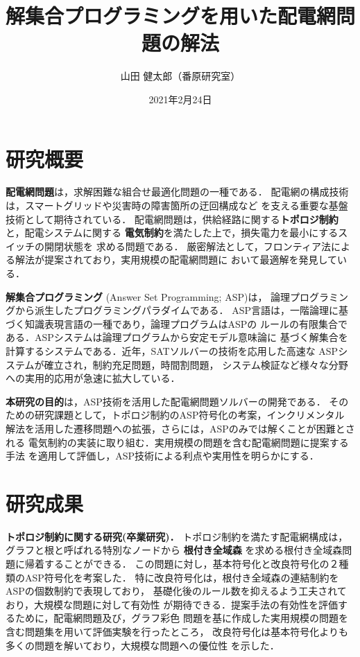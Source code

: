 \documentclass[a4j,10pt,dvipdfmx]{jarticle}
\title{解集合プログラミングを用いた配電網問題の解法}
\author{山田 健太郎（番原研究室）}
\date{2021年2月24日}
\newcommand{\mysection}[1]{\vspace{-15pt}\section{#1}} %
\begin{document}
\maketitle
\thispagestyle{empty}
\begin{multicols}{1}

\section{研究概要}

\textbf{配電網問題}は，求解困難な組合せ最適化問題の一種である．
配電網の構成技術は，スマートグリッドや災害時の障害箇所の迂回構成など
を支える重要な基盤技術として期待されている．
配電網問題は，供給経路に関する\textbf{トポロジ制約}と，配電システムに関する
\textbf{電気制約}を満たした上で，損失電力を最小にするスイッチの開閉状態を
求める問題である．
厳密解法として，フロンティア法による解法が提案されており，実用規模の配電網問題に
おいて最適解を発見している\cite{Minato:dnet:ZDD}．

\textbf{解集合プログラミング}
(Answer Set Programming; ASP\cite{inoue08:jssst})は，
論理プログラミングから派生したプログラミングパラダイムである．
ASP言語は，一階論理に基づく知識表現言語の一種であり，論理プログラムはASPの
ルールの有限集合である．ASPシステムは論理プログラムから安定モデル意味論に
基づく解集合を計算するシステムである．近年，SATソルバーの技術を応用した高速な
ASPシステムが確立され，制約充足問題，時間割問題，
システム検証など様々な分野への実用的応用が急速に拡大している．

\textbf{本研究の目的}は，ASP技術を活用した配電網問題ソルバーの開発である．
そのための研究課題として，トポロジ制約のASP符号化の考案，インクリメンタル
解法を活用した遷移問題への拡張，さらには，ASPのみでは解くことが困難とされる
電気制約の実装に取り組む．実用規模の問題を含む配電網問題に提案する手法
を適用して評価し，ASP技術による利点や実用性を明らかにする．


\mysection{研究成果}

\textbf{トポロジ制約に関する研究(卒業研究)．}
%
トポロジ制約を満たす配電網構成は，グラフと根と呼ばれる特別なノードから
\textbf{根付き全域森}\cite{Minato:dnet:netuki}
を求める根付き全域森問題に帰着することができる．
この問題に対し，基本符号化と改良符号化の２種類のASP符号化を考案した．
特に改良符号化は，根付き全域森の連結制約をASPの個数制約で表現しており，
基礎化後のルール数を抑えるよう工夫されており，大規模な問題に対して有効性
が期待できる．提案手法の有効性を評価するために，配電網問題及び，グラフ彩色
問題を基に作成した実用規模の問題を含む問題集を用いて評価実験を行ったところ，
改良符号化は基本符号化よりも多くの問題を解いており，大規模な問題への優位性
を示した．


\end{multicols}
\end{document}
